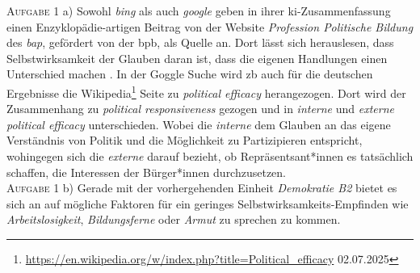 \textsc{Aufgabe 1} a) \quad
Sowohl \emph{bing} als auch \emph{google} geben in ihrer \gls{ki}-Zusammenfassung einen Enzyklopädie-artigen Beitrag von der Website \emph{Profession Politische Bildung} des \emph{\gls{bap}}, gefördert von der \gls{bpb}, als Quelle an. Dort lässt sich herauslesen, dass Selbstwirksamkeit der Glauben daran ist, dass die eigenen Handlungen einen Unterschied machen \autocite[]{Hufer.2022}. In der Goggle Suche wird \gls{zb} auch für die deutschen Ergebnisse die Wikipedia\footnote{
    \url{https://en.wikipedia.org/w/index.php?title=Political_efficacy} 02.07.2025} 
Seite zu \emph{political efficacy} herangezogen. Dort wird der Zusammenhang zu \emph{political responsiveness} gezogen und in \emph{interne} und \emph{externe} \emph{political efficacy} unterschieden. Wobei die \emph{interne} dem Glauben an das eigene Verständnis von Politik und die Möglichkeit zu Partizipieren entspricht, wohingegen sich die \emph{externe} darauf bezieht, ob Repräsentsant*innen es tatsächlich schaffen, die Interessen der Bürger*innen durchzusetzen. 
\\

\textsc{Aufgabe 1} b) \quad
Gerade mit der vorhergehenden Einheit \emph{Demokratie B2} bietet es sich an auf mögliche Faktoren für ein geringes Selbstwirksamkeits-Empfinden wie \emph{Arbeitslosigkeit}, \emph{Bildungsferne} oder \emph{Armut} zu sprechen zu kommen. 
\\

